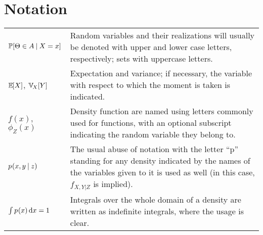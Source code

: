 \chapter*{Notation}
\label{cha:notation}

\begin{center}
  \renewcommand{\arraystretch}{1.5}
  \begin{tabular}{lp{}}
    \(\Prob{\Theta \in A \given X = x}\) & Random variables and their realizations will usually be
                                           denoted with upper and  lower case letters, respectively;
                                           sets with uppercase letters.\\
    \(\Exp{X}\), \(\Var[X]{Y}\) & Expectation and variance; if necessary, the variable with respect
                                  to which the moment is taken is indicated. \\
    \(f(x)\), \(\phi_Z(x)\) & Density function are named using letters commonly used for functions,
                              with an optional subscript indicating the random variable they belong
                              to. \\
    \(\prob{x, y \given z}\) & The usual abuse of notation with the letter \enquote{p} standing for
                               any density indicated by the names of the variables given to it is
                               used as well (in this case, \(f_{X,Y|Z}\) is implied). \\
    \(\int \prob{x} \dif x = 1\) & Integrals over the whole domain of a density are written as
                                   indefinite integrals, where the usage is clear.
  \end{tabular}
\end{center}

